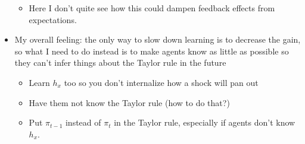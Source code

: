 \documentclass[11pt]{article}
\renewcommand{\[}{\begin{equation}}
\renewcommand{\]}{\end{equation}}
\begin{document}
\begin{itemize}
\begin{itemize}
\item Here I don't quite see how this could dampen feedback effects from expectations.
\end{itemize}
\item My overall feeling: the only way to slow down learning is to decrease the gain, so what I need to do instead is to make agents know as little as possible so they can't infer things about the Taylor rule in the future
\begin{itemize}
\item Learn $h_x$ too so you don't internalize how a shock will pan out
\item Have them not know the Taylor rule (how to do that?)
\item Put $\pi_{t-1}$ instead of $\pi_t$ in the Taylor rule, especially if agents don't know $h_x$.
\end{itemize}

\end{itemize}
\end{document}
